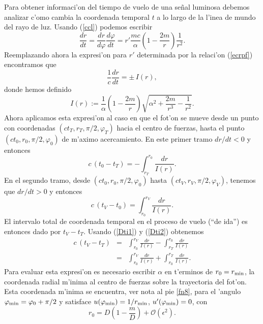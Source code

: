 Para obtener informaci'on del tiempo de vuelo de una se\~nal luminosa debemos analizar c'omo cambia la coordenada temporal $t$ a lo largo de la l'inea de mundo del rayo de luz.
Usando (\ref{ccl}) podemos escribir
\begin{equation}
\frac{dr}{dt}=\frac{dr}{d\varphi}\frac{d\varphi}{dt}=r'\frac{mc}{\alpha}\left(1-\frac{2m}{r}\right)\frac{1}{r^2}.
\end{equation}
Reemplazando ahora la expresi'on para $r'$ determinada por la relaci'on (\ref{ecrpf}) encontramos que
\begin{equation}
\frac{1}{c}\frac{dr}{dt}=\pm\, I(r),
\end{equation}
donde hemos definido
\begin{equation}
I(r):=\frac{1}{\alpha}\left(1-\frac{2m}{r}\right)\sqrt{\alpha^2+\frac{2m}{r^3}-\frac{1}{r^2}}.
\end{equation}
Ahora aplicamos esta expresi'on al caso en que el fot'on se mueve desde un punto con coordenadas $(ct_T,r_T,\pi/2,\varphi_T)$ hacia el centro de fuerzas, hasta el punto $(ct_0,r_0,\pi/2,\varphi_0)$ de m'aximo acercamiento. En este primer tramo $dr/dt<0$ y entonces
\begin{equation}\label{Dti1}
c\,(t_0-t_T)=-\int^{r_0}_{r_T}\frac{dr}{I(r)}.
\end{equation}
En el segundo tramo, desde $(ct_0,r_0,\pi/2,\varphi_0)$ hasta $(ct_V,r_V,\pi/2,\varphi_V)$, tenemos que $dr/dt>0$ y entonces
\begin{equation}\label{Dti2}
c\,(t_V-t_0)=\int_{r_0}^{r_V}\frac{dr}{I(r)}.
\end{equation}
El intervalo total de coordenada temporal en el proceso de vuelo (``de ida'') es entonces dado por $t_V-t_T$. Usando (\ref{Dti1}) y (\ref{Dti2}) obtenemos
\begin{eqnarray}
c\,(t_V-t_T)&=&\int_{r_0}^{r_V}\frac{dr}{I(r)}-\int^{r_0}_{r_T}\frac{dr}{I(r)} \\
&=&\int_{r_0}^{r_V}\frac{dr}{I(r)}+\int_{r_0}^{r_T}\frac{dr}{I(r)}. \label{cDtI}
\end{eqnarray}
Para evaluar esta expresi'on es necesario escribir $\alpha$ en t'erminos de $r_0=r_{\rm min}$, la coordenada radial m'inima al centro de fuerzas sobre la trayectoria del fot'on. Esta coordenada m'inima se encuentra, ver nota al pie \ref{fn8}, para el 'angulo $\varphi_{\rm min}=\varphi_0+\pi/2$ y satisface $u(\varphi_{\rm min})=1/r_{\rm min}$, $u'(\varphi_{\rm min})=0$, con
\begin{equation}
 r_0=D\left(1-\frac{m}{D}\right)+\mathcal{O}(\epsilon^2).
\end{equation}
